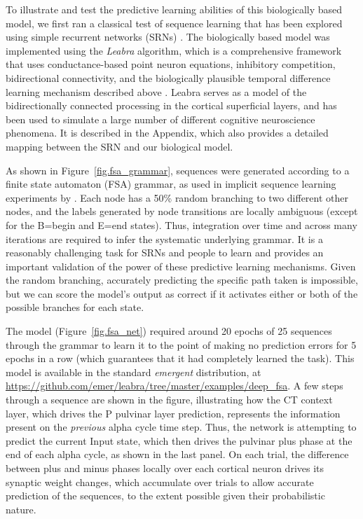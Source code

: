 \documentclass[11pt,twoside]{article}
\newif\myifpdf
\begin{document}
To illustrate and test the predictive learning abilities of this biologically based model, we first ran a classical test of sequence learning \citep{Reber67,CleeremansMcClelland91} that has been explored using simple recurrent networks (SRNs) \citep{Elman90,Jordan89}.  The biologically based model was implemented using the \emph{Leabra} algorithm, which is a comprehensive framework that uses conductance-based point neuron equations, inhibitory competition, bidirectional connectivity, and the biologically plausible temporal difference learning mechanism described above \citep{OReillyHazyHerd16,OReillyMunakataFrankEtAl12,OReillyMunakata00,OReilly98,OReilly96}.  Leabra serves as a model of the bidirectionally connected processing in the cortical superficial layers, and has been used to simulate a large number of different cognitive neuroscience phenomena.  It is described in the Appendix, which also provides a detailed mapping between the SRN and our biological model.

As shown in Figure~\ref{fig.fsa_grammar}, sequences were generated according to a finite state automaton (FSA) grammar, as used in implicit sequence learning experiments by \citet{Reber67}.  Each node has a 50\% random branching to two different other nodes, and the labels generated by node transitions are locally ambiguous (except for the B=begin and E=end states).  Thus, integration over time and across many iterations are required to infer the systematic underlying grammar.  It is a reasonably challenging task for SRNs and people to learn and provides an important validation of the power of these predictive learning mechanisms.  Given the random branching, accurately predicting the specific path taken is impossible, but we can score the model's output as correct if it activates either or both of the possible branches for each state.

The model (Figure~\ref{fig.fsa_net}) required around 20 epochs of 25 sequences through the grammar to learn it to the point of making no prediction errors for 5 epochs in a row (which guarantees that it had completely learned the task).  This model is available in the standard \emph{emergent} distribution, at \url{https://github.com/emer/leabra/tree/master/examples/deep_fsa}.  A few steps through a sequence are shown in the figure, illustrating how the CT context layer, which drives the P pulvinar layer prediction, represents the information present on the \emph{previous} alpha cycle time step.  Thus, the network is attempting to predict the current Input state, which then drives the pulvinar plus phase at the end of each alpha cycle, as shown in the last panel.  On each trial, the difference between plus and minus phases locally over each cortical neuron drives its synaptic weight changes, which accumulate over trials to allow accurate prediction of the sequences, to the extent possible given their probabilistic nature.
\end{document}
